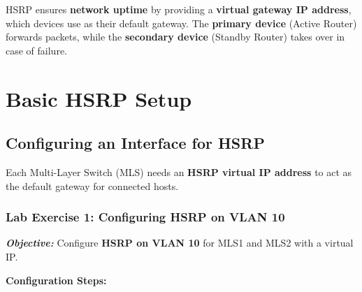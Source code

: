 \documentclass[a4paper]{book}
\begin{document}
HSRP ensures \textbf{network uptime} by providing a \textbf{virtual gateway IP address}, 
which devices use as their default gateway. The \textbf{primary device} (Active Router) 
forwards packets, while the \textbf{secondary device} (Standby Router) takes over in case 
of failure.


\vspace{1.5em}

\section{Basic HSRP Setup}

\subsection{Configuring an Interface for HSRP}
Each Multi-Layer Switch (MLS) needs an \textbf{HSRP virtual IP address} to act as the default 
gateway for connected hosts.

\subsubsection{Lab Exercise 1: Configuring HSRP on VLAN 10}
\textbf{\textit{Objective:}} Configure \textbf{HSRP on VLAN 10} for MLS1 and MLS2 with a virtual IP.

\vspace{1.5em}
\vspace{1.5em}

\textbf{Configuration Steps:}
\end{document}
